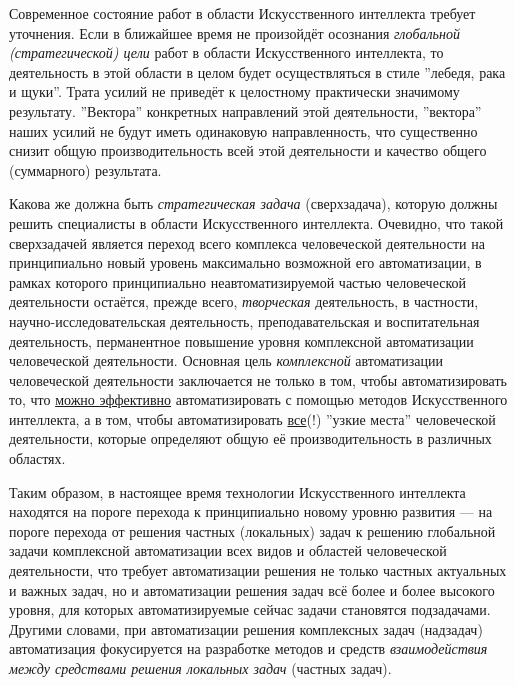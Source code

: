 Современное состояние работ в области Искусственного интеллекта требует уточнения. Если в ближайшее время не произойдёт осознания \textit{глобальной (стратегической) цели} работ в области Искусственного интеллекта, то деятельность в этой области в целом будет осуществляться в стиле ''лебедя, рака и щуки''. Трата усилий не приведёт к целостному практически значимому результату. ''Вектора'' конкретных направлений этой деятельности, ''вектора'' наших усилий не будут иметь одинаковую направленность, что существенно снизит общую  производительность всей этой деятельности и качество общего (суммарного) результата.

Какова же должна быть \textit{стратегическая задача} (сверхзадача), которую должны решить специалисты в области Искусственного интеллекта. Очевидно, что такой сверхзадачей является переход всего комплекса человеческой деятельности на принципиально новый уровень максимально возможной его автоматизации, в рамках которого принципиально неавтоматизируемой частью человеческой деятельности остаётся, прежде всего, \textit{творческая} деятельность, в частности, научно-исследовательская деятельность, преподавательская и воспитательная деятельность, перманентное повышение уровня комплексной автоматизации человеческой деятельности. Основная цель \textit{комплексной} автоматизации человеческой деятельности заключается не только в том, чтобы автоматизировать то, что \uline{можно эффективно} автоматизировать с помощью методов Искусственного интеллекта, а в том, чтобы автоматизировать \uline{все}(!) ''узкие места'' человеческой деятельности, которые определяют общую её производительность в различных областях.

Таким образом, в настоящее время технологии Искусственного интеллекта находятся на пороге перехода к принципиально новому уровню развития --- на пороге перехода от решения частных (локальных) задач к решению глобальной задачи комплексной автоматизации всех видов и областей человеческой деятельности, что требует автоматизации решения не только частных актуальных и важных задач, но и автоматизации решения задач всё более и более высокого уровня, для которых автоматизируемые сейчас задачи становятся подзадачами. Другими словами, при автоматизации решения комплексных задач (надзадач) автоматизация фокусируется на разработке методов и средств \textit{взаимодействия между средствами решения локальных задач} (частных задач).

